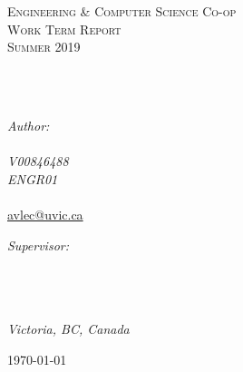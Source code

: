 \documentclass[
11pt, %
oneside, %
english, %
singlespacing, %
parskip, %
headsepline, %
chapterinoneline, %
]{MastersDoctoralThesis} %
\author{Alec \textsc{Cox}} %
\begin{document}
\frontmatter %

\pagestyle{plain} %


\begin{titlepage}
\begin{center}

\vspace*{.06\textheight}
{\scshape\LARGE \univname\par}\vspace{1.5cm} %
\textsc{\Large Engineering & Computer Science Co-op\\Work Term Report\\Summer 2019}\\[0.5cm] %

\HRule \\[0.4cm] %
{\huge \bfseries \ttitle\par}\vspace{0.4cm} %
\HRule \\[1.5cm] %
 
\begin{minipage}[t]{0.4\textwidth}
\begin{flushleft} \large
\emph{Author:}\\
\href{http://www.hardsoftware.net}{\authorname}\\ %
\textit{V00846488\\ENGR01\\\degreename}\\
\href{avlec@uvic.ca}{avlec@uvic.ca}
\end{flushleft}
\end{minipage}
\begin{minipage}[t]{0.4\textwidth}
\begin{flushright} \large
\emph{Supervisor:} \\
\href{http://www.auvic.ca}{\supname} %
\end{flushright}
\end{minipage}\\[3cm]
 
\vfill
\groupname\\\deptname\\
\large \textit{Victoria, BC, Canada}\\[0.3cm] %

 
\vfill

{\large \today}\\[4cm] %
 
\vfill
\end{center}
\end{titlepage}
\end{document}
